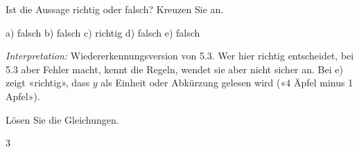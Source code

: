 \documentclass[11pt]{exam}
\newcommand{\aufgabe}[1]{%
  \needspace{8\baselineskip}%
  \renewcommand{\questionlabel}{\textbf{#1}}%
  \question}
\newcommand{\wahl}[1]{\mbox{$\Box$\,#1}}
\newcommand{\wahlr}[1]{\mbox{\ifprintanswers$\blacksquare$\,\textbf{#1}\else$\Box$\,#1\fi}}
\newcommand{\bruchabstand}{\setlength{\itemsep}{2.5ex}}
\newcommand{\diagnose}[1]{\par\smallskip\textit{Interpretation:} #1}
\begin{document}
\begin{questions}
\aufgabe{5.4}
Ist die Aussage richtig oder falsch? Kreuzen Sie an.
\begin{solution}
  a) falsch \quad b) falsch \quad c) richtig \quad d) falsch \quad e) falsch
  \diagnose{Wiedererkennungsversion von 5.3. Wer hier richtig entscheidet, bei
  5.3 aber Fehler macht, kennt die Regeln, wendet sie aber nicht sicher an.
  Bei e) zeigt «richtig», dass $y$ als Einheit oder Abkürzung gelesen wird
  («4 Äpfel minus 1 Apfel»).}
\end{solution}

\aufgabe{6.3}
Lösen Sie die Gleichungen.
\begin{multicols}{3}
\end{multicols}
\end{questions}
\end{document}
